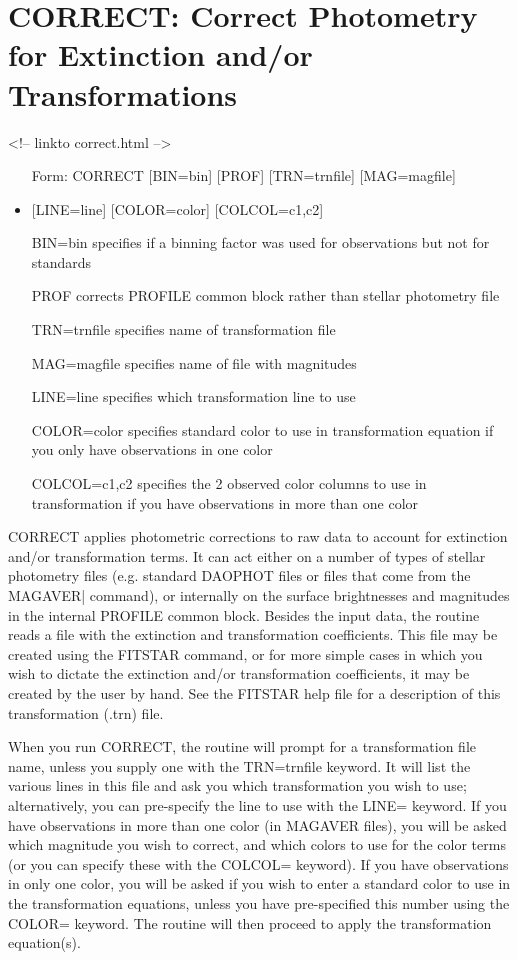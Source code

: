 \section{CORRECT: Correct Photometry for Extinction and/or Transformations}
\begin{rawhtml}
<!-- linkto correct.html -->
\end{rawhtml}
\begin{itemize}
  \item[Form: CORRECT  {[BIN=bin]} {[PROF]} {[TRN=trnfile]} {[MAG=magfile]}\hfill]{}
  \item{{[LINE=line]} {[COLOR=color]} {[COLCOL=c1,c2]}}
  \item[BIN=bin]{specifies if a binning factor was used
for observations but not for standards}
  \item[PROF]{corrects PROFILE common block rather than stellar photometry file}
  \item[TRN=trnfile]{specifies name of transformation file}
  \item[MAG=magfile]{ specifies name of file with magnitudes}
  \item[LINE=line ]{specifies which transformation line to use}
  \item[COLOR=color]{specifies standard color to use in
transformation equation if you only have observations in one color}
  \item[COLCOL=c1,c2  ]{  specifies the 2 observed color columns to 
use in transformation if you have observations in more than one color}
\end{itemize}


CORRECT applies photometric corrections to raw data to account for
extinction and/or transformation terms.  It can act either on a number of
types of stellar photometry files (e.g. standard DAOPHOT files or files
that come from the MAGAVER| command), or internally on the surface
brightnesses and magnitudes in the internal PROFILE common block. Besides
the input data, the routine reads a file with the extinction and
transformation coefficients. This file may be created using the FITSTAR
command, or for more simple cases in which you wish to dictate the
extinction and/or transformation coefficients, it may be created by the
user by hand. See the FITSTAR help file for a description of this
transformation (.trn) file.

When you run CORRECT, the routine will prompt for a transformation file
name, unless you supply one with the TRN=trnfile keyword.  It will list the
various lines in this file and ask you which transformation you wish to
use; alternatively, you can pre-specify the line to use with the LINE=
keyword. If you have observations in more than one color (in MAGAVER
files), you will be asked which magnitude you wish to correct, and which
colors to use for the color terms (or you can specify these with the
COLCOL= keyword).  If you have observations in only one color, you will be
asked if you wish to enter a standard color to use in the transformation
equations, unless you have pre-specified this number using the COLOR=
keyword. The routine will then proceed to apply the transformation
equation(s).

